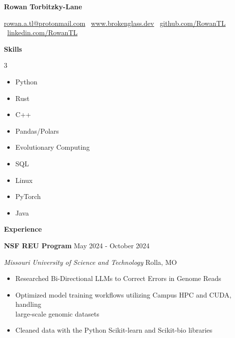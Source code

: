 \documentclass[11pt]{article}
\begin{document}
\begin{center}
    \textbf{\huge Rowan Torbitzky-Lane}\\
    \hrulefill
\end{center}

\begin{center}
    \href{mailto:rowan.a.tl@protonmail.com}{rowan.a.tl@protonmail.com} \textbullet \ \href{www.brokenglass.dev}{www.brokenglass.dev} \textbullet \ \href{github.com/RowanTL}{github.com/RowanTL} \textbullet  \ \href{linkedin.com/RowanTL}{linkedin.com/RowanTL}
\end{center}


\begin{center}
    \textbf{Skills}
\end{center}

\begin{multicols}{3}
    \begin{itemize}[noitemsep, topsep=0pt, partopsep=0pt, parsep=0pt, itemsep=0pt]
        \item Python
        \item Rust
        \item C++
        \item Pandas/Polars
        \item Evolutionary Computing
        \item SQL
        \item Linux
        \item PyTorch
        \item Java
    \end{itemize}
\end{multicols}

\begin{center}
    \textbf{Experience}
\end{center}

\textbf{NSF REU Program} \hfill May 2024 - October 2024

\textsl{Missouri University of Science and Technology} \hfill Rolla, MO
\begin{itemize}[noitemsep, topsep=0pt, partopsep=0pt, parsep=0pt, itemsep=0pt]
    \item Researched Bi-Directional LLMs to Correct Errors in Genome Reads
    \item Optimized model training workflows utilizing Campus HPC and CUDA, handling \\large-scale genomic datasets
    \item Cleaned data with the Python Scikit-learn and Scikit-bio libraries
\end{itemize}
\end{document}
